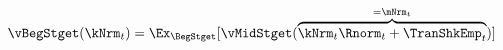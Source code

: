   \begin{equation}\begin{gathered}\begin{aligned}
\vBegStget(\kNrm_{t}) & = \Ex_{\BegStget}[\vMidStget(\overbrace{\kNrm_{t} \Rnorm_{t} + \TranShkEmp_{t}}^{=\mNrm_{t}})]  \label{eq:vBegStget}
      \end{aligned}\end{gathered}\end{equation}
